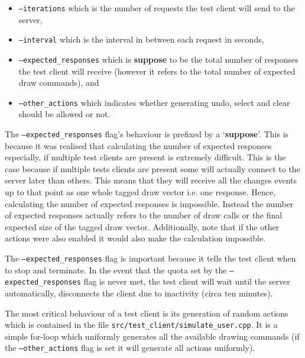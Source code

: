 \documentclass[article]{uom-coursework}
\begin{document}
\begin{itemize}
    \item \texttt{--iterations} which is the number of requests
        the test client will send to the server,
    \item \texttt{--interval} which is the interval in between
        each request in seconds,
    \item \texttt{--expected\_responses} which is
        \textbf{suppose} to be the total number of responses the
        test client will receive (however it refers to the total
        number of expected draw commands), and
    \item \texttt{--other\_actions} which indicates whether
        generating undo, select and clear should be allowed or
        not.
\end{itemize}

\begin{marker}
    The \texttt{--expected\_responses} flag's behaviour is
    prefixed by a `\textbf{suppose}'. This is because it was
    realised that calculating the number of expected responses
    especially, if multiple test clients are present is
    extremely difficult. This is the case because if multiple
    tests clients are present some will actually connect to the
    server later than others. This means that they will receive
    all the changes events up to that point as one whole tagged
    draw vector i.e. one response. Hence, calculating the number
    of expected responses is impossible. Instead the number of
    expected responses actually refers to the number of draw
    calls or the final expected size of the tagged draw vector.
    Additionally, note that if the other actions were also
    enabled it would also make the calculation impossible.
\end{marker}

The \texttt{--expected\_responses} flag is important because it
tells the test client when to stop and terminate. In the event
that the quota set by the \texttt{--expected\_responses} flag is
never met, the test client will wait until the server
automatically, disconnects the client due to inactivity (circa
ten minutes).

The most critical behaviour of a test client is its generation
of random actions which is contained in the file
\texttt{src/test\_client/simulate\_user.cpp}. It is a simple
for-loop which uniformly generates all the available drawing
commands (if the \texttt{--other\_actions} flag is set it will
generate all actions uniformly).
\end{document}
